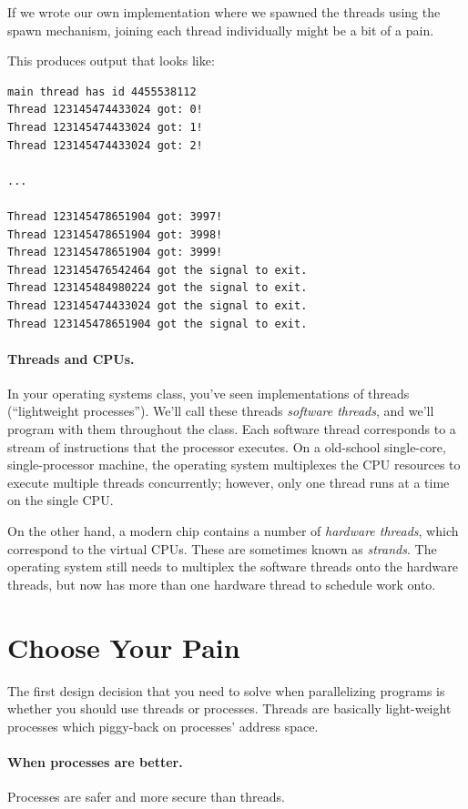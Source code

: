 \documentclass[a4paper]{report}
\begin{document}
If we wrote our own implementation where we spawned the threads using the spawn mechanism, joining each thread individually might be a bit of a pain. 

This produces output that looks like:

\begin{verbatim}
main thread has id 4455538112
Thread 123145474433024 got: 0!
Thread 123145474433024 got: 1!
Thread 123145474433024 got: 2!

...

Thread 123145478651904 got: 3997!
Thread 123145478651904 got: 3998!
Thread 123145478651904 got: 3999!
Thread 123145476542464 got the signal to exit.
Thread 123145484980224 got the signal to exit.
Thread 123145474433024 got the signal to exit.
Thread 123145478651904 got the signal to exit.
\end{verbatim}

\paragraph{Threads and CPUs.} In your operating systems class,
you've seen implementations of threads (``lightweight processes'').
We'll call these threads \emph{software threads}, and we'll program
with them throughout the class. Each software thread corresponds to a
stream of instructions that the processor executes. On a old-school
single-core, single-processor machine, the operating system
multiplexes the CPU resources to execute multiple threads
concurrently; however, only one thread runs at a time on the single
CPU.

On the other hand, a modern chip contains a number of \emph{hardware
threads}, which correspond to the virtual CPUs. These are sometimes
known as \emph{strands}. The operating system still needs to 
multiplex the software threads onto the hardware threads, but now has
more than one hardware thread to schedule work onto.





\section*{Choose Your Pain}
The first design decision that you need to solve when parallelizing programs
is whether you should use threads or processes. Threads are basically light-weight processes which piggy-back on
          processes' address space.

\paragraph{When processes are better.} Processes are safer and more secure than threads.
\end{document}
